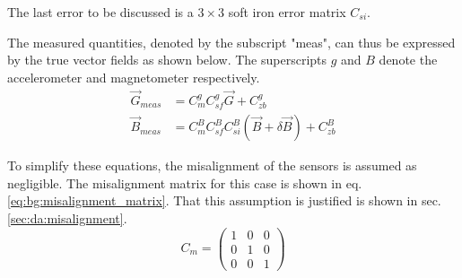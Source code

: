 The last error to be discussed is a $3\times3$ soft iron error matrix $C_{si}$.

The measured quantities, denoted by the subscript "meas", can thus be expressed by the true vector fields as shown below. The superscripts $g$ and $B$ denote the accelerometer and magnetometer respectively.
\begin{align}
    \vec{G}_{meas}&=C^g_mC^g_{sf}\vec G+C_{zb}^g \label{eq:bg:g_with_errors}\\
    \vec{B}_{meas}&=C^B_mC^B_{sf}C^B_{si}(\vec{B}+\delta\vec{B})+C_{zb}^B
    \label{eq:bg:b_with_errors}
\end{align}

To simplify these equations, the misalignment of the sensors is assumed as negligible. The misalignment matrix for this case is shown in eq. \eqref{eq:bg:misalignment_matrix}. That this assumption is justified is shown in sec. \ref{sec:da:misalignment}.
\begin{equation}
    C_m= \begin{pmatrix} 1 & 0 & 0 \\
                         0 & 1 & 0 \\
                         0 & 0 & 1 \end{pmatrix}
                         \label{eq:bg:misalignment_matrix}
\end{equation}